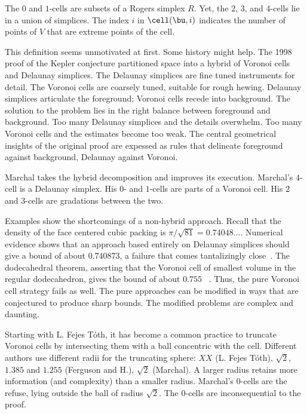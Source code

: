 The $0$ and $1$-cells are  subsets of a Rogers  simplex
$R$.  Yet, the $2$, $3$, and $4$-cells lie in a union of
simplices.  The index $i$ in  $\cell(\bu,i)$ indicates the number
of points of $V$ that are extreme points of the cell. 

This definition seems unmotivated at first.  Some history might help.
The 1998 proof of the Kepler conjecture partitioned space into a
hybrid of Voronoi cells and Delaunay simplices.  The Delaunay
simplices are fine tuned instruments for detail.  The Voronoi cells
are coarsely tuned, suitable for rough hewing.  Delaunay simplices
articulate the foreground; Voronoi cells recede into background.  The
solution to the problem lies in the right balance between foreground
and background.  Too many Delaunay simplices and the details
overwhelm.  Too many Voronoi cells and the estimates become too weak.
The central geometrical insights of the original proof are expessed as
rules that delineate foreground against background, Delaunay against
Voronoi.

Marchal takes the  hybrid decomposition and improves its
execution.  Marchal's $4$-cell is a Delaunay simplex.  His $0$- and
$1$-cells are parts of a Voronoi cell.  His $2$ and $3$-cells are
gradations between the two.

Examples show the shortcomings of a non-hybrid approach.
Recall that the density of the face centered cubic packing is
$\pi/\sqrt{81}=0.74048\ldots$.  Numerical evidence shows that an
approach based entirely on Delaunay simplices should give a bound of
about $0.740873$, a failure that comes tantalizingly
close~\cite{Hales:1992:JCAM}.  The dodecahedral theorem, asserting that the
Voronoi cell of smallest volume in the regular dodecahedron, gives the
bound of about $0.755$ ~\cite{Hales:2010:Dodec}.  Thus, the pure Voronoi cell
strategy fails as well.  The pure approaches can be modified in ways
that are conjectured to produce sharp bounds. The modified problems
are complex and daunting.

Starting with L. Fejes T\'oth, it has become a common practice to
truncate Voronoi cells by intersecting them with a ball concentric
with the cell.  Different authors use different radii for the
truncating sphere: $XX$ (L. Fejes T\'oth), $\sqrt2$, $1.385$ and
$1.255$ (Ferguson and H.), $\sqrt2$ (Marchal).  A larger radius retains more
information (and complexity) than a smaller radius.  Marchal's
$0$-cells are the refuse, lying outside the ball of radius $\sqrt2$.
The $0$-cells are inconsequential to the proof.


